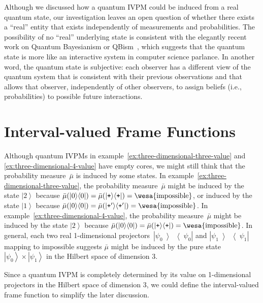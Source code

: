 \documentclass{article}
\theoremstyle{remark}
\newcommand{\imposs}{{\mbox{\wesa{impossible}}}}
\newcommand{\ket}[1]{{\left\vert{#1}\right\rangle}}
\newcommand{\op}[2]{\ensuremath{\left\vert{#1}\middle\rangle\middle\langle{#2}\right\vert}}
\newcommand{\proj}[1]{\op{#1}{#1}}
\newcommand{\ps}{\texttt{+}}
\begin{document}
Although we discussed how a quantum IVPM could be induced from a real
quantum state, our investigation leaves an open question of whether
there exists a ``real'' entity that exists independently of measurements
and probabilities. The possibility of no ``real'' underlying state
is consistent with the elegantly recent work on Quantum Bayesianism
or QBism~\cite{Fuchs2010,VonBaeyer2016,Fuchs2012}, which suggests
that the quantum state is more like an interactive system in computer
science parlance. In another word, the quantum state is subjective:
each observer has a different view of the quantum system that is consistent
with their previous observations and that allows that observer, independently
of other observers, to assign beliefs (i.e., probabilities) to possible
future interactions.

\newpage{}%

\printbibliography

\appendix

\section{Interval-valued Frame Functions\label{sec:Interval-valued-Frame-Functions}}

Although quantum IVPMs in example~\ref{ex:three-dimensional-three-value}
and \ref{ex:three-dimensional-4-value} have empty cores, we might
still think that the probability measure~$\bar{\mu}$ is induced
by some states. In example~\ref{ex:three-dimensional-three-value},
the probability measure~$\bar{\mu}$ might be induced by the state
$\ket{2}$ because $\bar{\mu}(\proj{0})=\bar{\mu}(\proj{\ps})=\imposs$,
or induced by the state $\ket{1}$ because $\bar{\mu}(\proj{0})=\bar{\mu}(\proj{\ps'})=\imposs$.
In example~\ref{ex:three-dimensional-4-value}, the probability measure~$\bar{\mu}$
might be induced by the state $\ket{2}$ because $\bar{\mu}(\proj{0})=\bar{\mu}(\proj{\ps})=\imposs$.
In general, each two real 1-dimensional projectors~$\proj{\psi_{0}}$
and $\proj{\psi_{1}}$ mapping to impossible suggests $\bar{\mu}$
might be induced by the pure state~$\ket{\psi_{0}}\times\ket{\psi_{1}}$
in the Hilbert space of dimension 3.

Since a quantum IVPM is completely determined by its value on 1-dimensional
projectors in the Hilbert space of dimension 3, we could define the
interval-valued frame function to simplify the later discussion.
\end{document}
